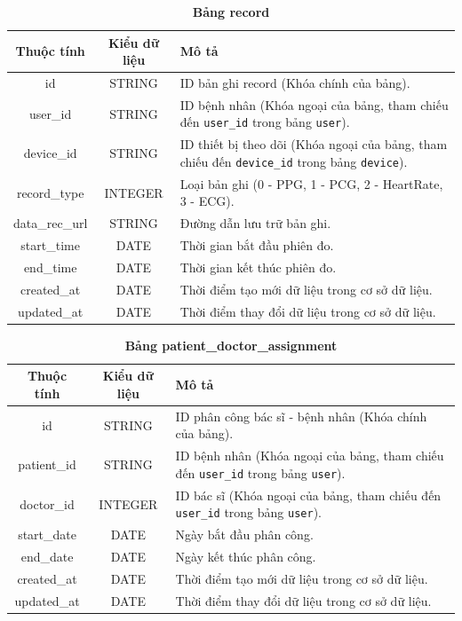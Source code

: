 \begin{table}[H]
  \caption{\bfseries \fontsize{12pt}{0pt}\selectfont Bảng record}
  \centering
  \begin{tabularx}{0.9\textwidth}{|c|c|X|}
    \hline
    \textbf{Thuộc tính} & \textbf{Kiểu dữ liệu} & \textbf{Mô tả} \\
    \hline
    id & STRING & ID bản ghi record (Khóa chính của bảng). \\
    \hline
    user\_id & STRING & ID bệnh nhân (Khóa ngoại của bảng, tham chiếu đến \texttt{user\_id} trong bảng \texttt{user}). \\
    \hline
    device\_id & STRING & ID thiết bị theo dõi (Khóa ngoại của bảng, tham chiếu đến \texttt{device\_id} trong bảng \texttt{device}). \\
    \hline
    record\_type & INTEGER & Loại bản ghi (0 - PPG, 1 - PCG, 2 - HeartRate, 3 - ECG). \\
    \hline
    data\_rec\_url & STRING & Đường dẫn lưu trữ bản ghi. \\
    \hline
    start\_time & DATE & Thời gian bắt đầu phiên đo. \\
    \hline
    end\_time & DATE & Thời gian kết thúc phiên đo. \\
    \hline
    created\_at & DATE & Thời điểm tạo mới dữ liệu trong cơ sở dữ liệu. \\
    \hline
    updated\_at & DATE & Thời điểm thay đổi dữ liệu trong cơ sở dữ liệu. \\
    \hline
  \end{tabularx}
\end{table}

\begin{table}[H]
  \caption{\bfseries \fontsize{12pt}{0pt}\selectfont Bảng patient\_doctor\_assignment}
  \centering
  \begin{tabularx}{0.9\textwidth}{|c|c|X|}
    \hline
    \textbf{Thuộc tính} & \textbf{Kiểu dữ liệu} & \textbf{Mô tả} \\
    \hline
    id & STRING & ID phân công bác sĩ - bệnh nhân (Khóa chính của bảng). \\
    \hline
    patient\_id & STRING & ID bệnh nhân (Khóa ngoại của bảng, tham chiếu đến \texttt{user\_id} trong bảng \texttt{user}). \\
    \hline
    doctor\_id & INTEGER & ID bác sĩ (Khóa ngoại của bảng, tham chiếu đến \texttt{user\_id} trong bảng \texttt{user}). \\
    \hline
    start\_date & DATE & Ngày bắt đầu phân công. \\
    \hline
    end\_date & DATE & Ngày kết thúc phân công. \\
    \hline
    created\_at & DATE & Thời điểm tạo mới dữ liệu trong cơ sở dữ liệu. \\
    \hline
    updated\_at & DATE & Thời điểm thay đổi dữ liệu trong cơ sở dữ liệu. \\
    \hline
  \end{tabularx}
\end{table}

